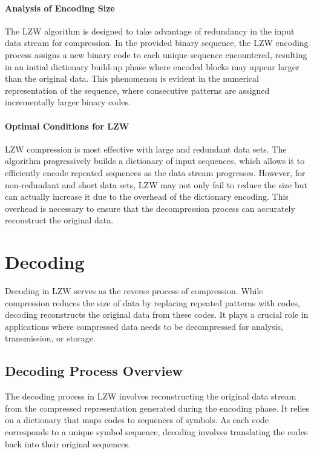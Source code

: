 \documentclass[12pt, a4paper]{article}
\begin{document}
\paragraph{Analysis of Encoding Size}
The LZW algorithm is designed to take advantage of redundancy in the input data stream for compression. In the provided binary sequence, the LZW encoding process assigns a new binary code to each unique sequence encountered, resulting in an initial dictionary build-up phase where encoded blocks may appear larger than the original data. This phenomenon is evident in the numerical representation of the sequence, where consecutive patterns are assigned incrementally larger binary codes.

\paragraph{Optimal Conditions for LZW}
LZW compression is most effective with large and redundant data sets. The algorithm progressively builds a dictionary of input sequences, which allows it to efficiently encode repeated sequences as the data stream progresses. However, for non-redundant and short data sets, LZW may not only fail to reduce the size but can actually increase it due to the overhead of the dictionary encoding. This overhead is necessary to ensure that the decompression process can accurately reconstruct the original data.

\section{Decoding}

Decoding in LZW serves as the reverse process of compression. While compression reduces the size of data by replacing repeated patterns with codes, decoding reconstructs the original data from these codes. It plays a crucial role in applications where compressed data needs to be decompressed for analysis, transmission, or storage.\cite{liu2012survey}

\subsection{Decoding Process Overview}

The decoding process in LZW involves reconstructing the original data stream from the compressed representation generated during the encoding phase. It relies on a dictionary that maps codes to sequences of symbols. As each code corresponds to a unique symbol sequence, decoding involves translating the codes back into their original sequences. \cite{shannon1948mathematical}
\end{document}
